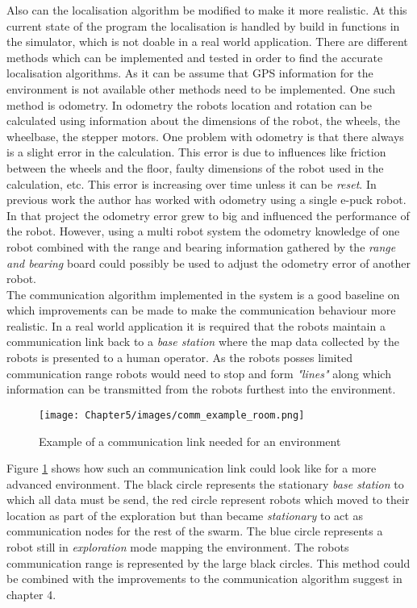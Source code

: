 Also can the localisation algorithm be modified to make it more realistic. 
At this current state of the program the localisation is handled by build in functions in the simulator, which is not doable in a real world application. 
There are different methods which can be implemented and tested in order to find the accurate localisation algorithms. As it can be assume that GPS information for the environment is not available other methods need to be implemented. 
One such method is odometry. In odometry the robots location and rotation can be calculated using information about the dimensions of the robot, the wheels, the wheelbase, the stepper motors. 
One problem with odometry is that there always is a slight error in the calculation. This error is due to influences like friction between the wheels and the floor, faulty dimensions of the robot used in the calculation, etc.
This error is increasing over time unless it can be \textit{reset}. In previous work the author has worked with odometry using a single e-puck robot. In that project the odometry error grew to big and influenced the performance of the robot.
However, using a multi robot system the odometry knowledge of one robot combined with the range and bearing information gathered by the \textit{range and bearing} board could possibly be used to adjust the odometry error of another robot.\\

The communication algorithm implemented in the system is a good baseline on which improvements can be made to make the communication behaviour more realistic. 
In a real world application it is required that the robots maintain a communication link back to a \textit{base station} where the map data collected by the robots is presented to a human operator.
As the robots posses limited communication range robots would need to stop and form \textit{"lines"} along which information can be transmitted from the robots furthest into the environment.

\begin{figure}[h]
\centering
\texttt{[image: Chapter5/images/comm\_example\_room.png]}
\caption[Example of a communication link needed for an environment]{Example of a communication link needed for an environment\footnotemark}
\label{fig:comms_example}
\end{figure}


Figure \ref{fig:comms_example} shows how such an communication link could look like for a more advanced environment. The black circle represents the stationary \textit{base station} to which all data must be send, the red circle represent robots which moved to their location as part of the exploration but than became \textit{stationary} to act as communication nodes for the rest of the swarm.
The blue circle represents a robot still in \textit{exploration} mode mapping the environment. 
The robots communication range is represented by the large black circles.
This method could be combined with the improvements to the communication algorithm suggest in chapter 4. 

